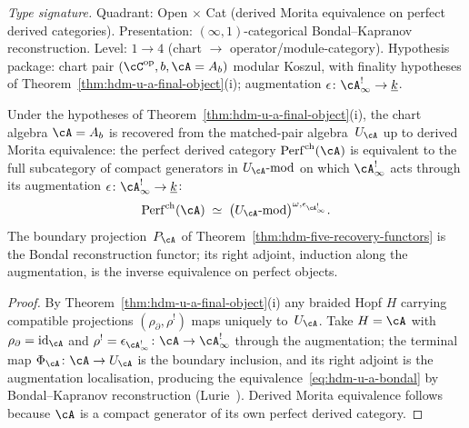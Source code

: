\begin{corollary}
\label{cor:hdm-u-a-bondal-reconstruction}
\emph{Type signature.} Quadrant: Open $\times$ Cat
(derived Morita equivalence on perfect derived categories).
Presentation: $(\infty,1)$-categorical Bondal--Kapranov
reconstruction. Level: $1\!\to\!4$ (chart $\to$
operator/module-category). Hypothesis package: chart pair
$(\cC^{\mathrm{op}}, b, \cA = A_b)$ modular Koszul, with
finality hypotheses of Theorem~\textup{\ref{thm:hdm-u-a-final-object}}(i);
augmentation $\epsilon\colon\cA^!_\infty\to\underline k$.

Under the hypotheses of Theorem~\ref{thm:hdm-u-a-final-object}(i),
the chart algebra $\cA = A_b$ is recovered from the
matched-pair algebra~$U_\cA$ up to derived Morita equivalence: the
perfect derived category
$\mathrm{Perf}^{\mathrm{ch}}(\cA)$
is equivalent to the full subcategory of compact
generators in $U_\cA\text{-}\mathrm{mod}$ on which
$\cA^!_\infty$ acts through its augmentation
$\epsilon\colon \cA^!_\infty\to\underline k$:
\begin{equation}\label{eq:hdm-u-a-bondal}
\mathrm{Perf}^{\mathrm{ch}}(\cA)
\;\simeq\;
\bigl(U_\cA\text{-}\mathrm{mod}\bigr)^{\omega,\epsilon_{\cA^!_\infty}}.
\end{equation}
The boundary projection~$P_\cA$ of
Theorem~\ref{thm:hdm-five-recovery-functors} is the
Bondal reconstruction functor; its right adjoint, induction along the
augmentation, is the inverse equivalence on perfect objects.
\end{corollary}

\begin{proof}
By Theorem~\ref{thm:hdm-u-a-final-object}(i) any braided Hopf $H$
carrying compatible projections $(\rho_\partial,\rho^!)$ maps uniquely
to~$U_\cA$. Take $H = \cA$ with $\rho_\partial=\mathrm{id}_\cA$ and
$\rho^! = \epsilon_{\cA^!_\infty}\colon \cA\to\cA^!_\infty$ through the
augmentation; the terminal map $\Phi_\cA\colon \cA\to U_\cA$ is the
boundary inclusion, and its right adjoint is the augmentation
localisation, producing the equivalence~\eqref{eq:hdm-u-a-bondal} by
Bondal--Kapranov reconstruction (Lurie~\cite[Prop.~7.1.2.6]{HA}).
Derived Morita equivalence follows because $\cA$ is a compact
generator of its own perfect derived category.
\end{proof}

